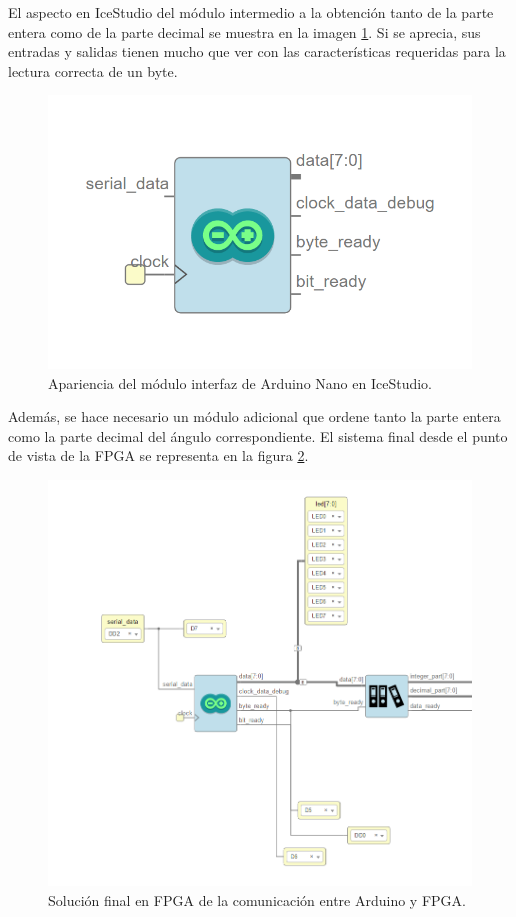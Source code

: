 El aspecto en IceStudio del módulo intermedio a la obtención tanto de la parte entera como de la parte decimal se muestra en la imagen \ref{fig:arduino_interface}. Si se aprecia, sus entradas y salidas tienen mucho que ver con las características requeridas para la lectura correcta de un byte.

\begin{figure}[H]
	\center
	\includegraphics[scale=0.6]{imagenes/Balancing_robot/arduino_interface.PNG}
	\caption{Apariencia del módulo interfaz de Arduino Nano en IceStudio.}
	\label{fig:arduino_interface}
\end{figure}

Además, se hace necesario un módulo adicional que ordene tanto la parte entera como la parte decimal del ángulo correspondiente. El sistema final desde el punto de vista de la FPGA se representa en la figura \ref{fig:arduino_arrange}.

\begin{figure}[H]
	\center
	\includegraphics[scale=0.6]{imagenes/Balancing_robot/arduino_arrange.PNG}
	\caption{Solución final en FPGA de la comunicación entre Arduino y FPGA.}
	\label{fig:arduino_arrange}
\end{figure}




